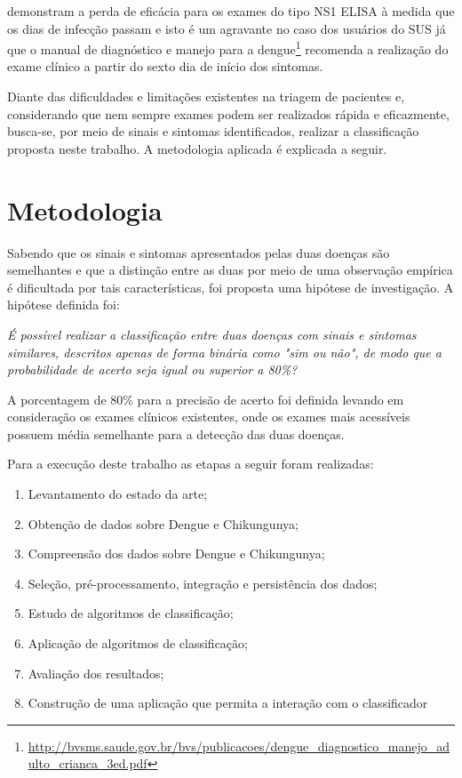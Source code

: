  demonstram a perda de eficácia para os exames do tipo NS1 ELISA à medida que os dias de infecção passam e isto é um agravante no caso dos usuários do SUS já que o manual de diagnóstico e manejo para a dengue\footnote{\url{http://bvsms.saude.gov.br/bvs/publicacoes/dengue_diagnostico_manejo_adulto_crianca_3ed.pdf}} recomenda a realização do exame clínico a partir do sexto dia de início dos sintomas.

Diante das dificuldades e limitações existentes na triagem de pacientes e, considerando que nem sempre exames podem ser realizados rápida e eficazmente, busca-se, por meio de sinais e sintomas identificados, realizar a classificação proposta neste trabalho. A metodologia aplicada é explicada a seguir.

\section{Metodologia}
Sabendo que os sinais e sintomas apresentados pelas duas doenças são semelhantes e que a distinção entre as duas por meio de uma observação empírica é dificultada por tais características, foi proposta uma hipótese de investigação. A hipótese definida foi:

\textit{É possível realizar a classificação entre duas doenças com sinais e sintomas similares, descritos apenas de forma binária como "sim ou não", de modo que a probabilidade de acerto seja igual ou superior a 80\%?}

A porcentagem de 80\% para a precisão de acerto foi definida levando em consideração os exames clínicos existentes, onde os exames mais acessíveis possuem média semelhante para a detecção das duas doenças.

Para a execução deste trabalho as etapas a seguir foram realizadas:

\begin{enumerate}[label=\roman*]
 \item Levantamento do estado da arte;
 \item Obtenção de dados sobre Dengue e Chikungunya;
 \item Compreensão dos dados sobre Dengue e Chikungunya;
 \item Seleção, pré-processamento, integração e persistência dos dados;
 \item Estudo de algoritmos de classificação;
 \item Aplicação de algoritmos de classificação;
 \item Avaliação dos resultados;
 \item Construção de uma aplicação que permita a interação com o classificador
\end{enumerate}


